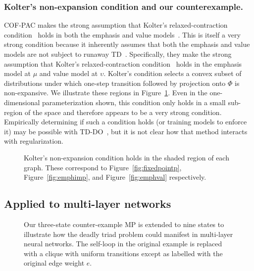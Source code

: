 \subsubsection{Kolter's non-expansion condition and our counterexample. }
COF-PAC makes the strong assumption that Kolter's relaxed-contraction condition~\cite[eqn.~10]{kolter2011fixed} holds in both the emphasis and value models~\cite[asm.~4]{zhang2020provably}. This is itself a very strong condition because it inherently assumes that both the emphasis and value models are not subject to runaway TD~\cite[asm.~4]{zhang2020provably}. Specifically, they make the strong assumption that Kolter's relaxed-contraction condition~\cite[eqn.~10]{kolter2011fixed} holds in the emphasis model at $\mu$ and value model at $\upsilon$. Kolter's condition selects a convex subset of distributions under which one-step transition followed by projection onto $\Phi$ is non-expansive. We illustrate these regions in Figure~\ref{fig:koldercond}. Even in the one-dimensional parameterization shown, this condition only holds in a small sub-region of the space and therefore appears to be a very strong condition. Empirically determining if such a condition holds (or training models to enforce it) may be possible with TD-DO~\cite[sec~4.1]{kolter2011fixed}, but it is not clear how that method interacts with regularization.~\label{sec:nosingularity}

\begin{figure}
	\centering
	
	\caption{Kolter's non-expansion condition holds in the shaded region of each graph. These correspond to Figure~\ref{fig:fixedpointp}, Figure~\ref{fig:emphimp}, and Figure~\ref{fig:emphval} respectively. }
	\label{fig:koldercond}
\end{figure}


\subsection{Applied to multi-layer networks}
\label{sec:multilayer}


\begin{figure}
	
	\caption{Our three-state counter-example MP is extended to nine states to illustrate how the deadly triad problem could manifest in multi-layer neural networks. The self-loop in the original example is replaced with a clique with uniform transitions except as labelled with the original edge weight $e$. }
	\label{fig:multilayermdp}
\end{figure}


